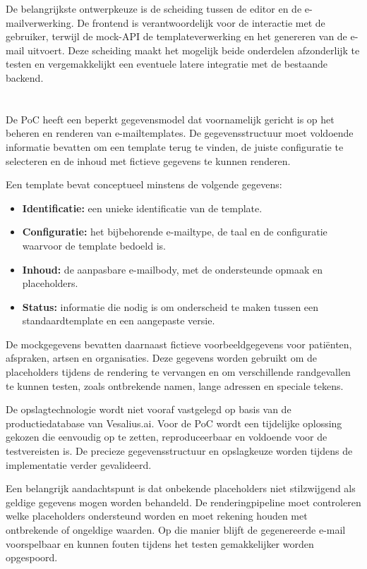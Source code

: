 De belangrijkste ontwerpkeuze is de scheiding tussen de editor en de
e-mailverwerking. De frontend is verantwoordelijk voor de interactie met de
gebruiker, terwijl de mock-API de templateverwerking en het genereren van de
e-mail uitvoert. Deze scheiding maakt het mogelijk beide onderdelen
afzonderlijk te testen en vergemakkelijkt een eventuele latere integratie
met de bestaande backend.

\section{}%
\label{sec:gegevensmodel}
De PoC heeft een beperkt gegevensmodel dat voornamelijk gericht is op het
beheren en renderen van e-mailtemplates. De gegevensstructuur moet voldoende
informatie bevatten om een template terug te vinden, de juiste configuratie
te selecteren en de inhoud met fictieve gegevens te kunnen renderen.

Een template bevat conceptueel minstens de volgende gegevens:
\begin{itemize}
    \item \textbf{Identificatie:} een unieke identificatie van de template.
    \item \textbf{Configuratie:} het bijbehorende e-mailtype, de taal en
    de configuratie waarvoor de template bedoeld is.
    \item \textbf{Inhoud:} de aanpasbare e-mailbody, met de ondersteunde
    opmaak en placeholders.
    \item \textbf{Status:} informatie die nodig is om onderscheid te maken
    tussen een standaardtemplate en een aangepaste versie.
\end{itemize}

De mockgegevens bevatten daarnaast fictieve voorbeeldgegevens voor patiënten,
afspraken, artsen en organisaties. Deze gegevens worden gebruikt om de
placeholders tijdens de rendering te vervangen en om verschillende
randgevallen te kunnen testen, zoals ontbrekende namen, lange adressen en
speciale tekens.

De opslagtechnologie wordt niet vooraf vastgelegd op basis van de
productiedatabase van Vesalius.ai. Voor de PoC wordt een tijdelijke
oplossing gekozen die eenvoudig op te zetten, reproduceerbaar en voldoende
voor de testvereisten is. De precieze gegevensstructuur en opslagkeuze
worden tijdens de implementatie verder gevalideerd.

Een belangrijk aandachtspunt is dat onbekende placeholders niet stilzwijgend
als geldige gegevens mogen worden behandeld. De renderingpipeline moet
controleren welke placeholders ondersteund worden en moet rekening houden
met ontbrekende of ongeldige waarden. Op die manier blijft de gegenereerde
e-mail voorspelbaar en kunnen fouten tijdens het testen gemakkelijker
worden opgespoord.

